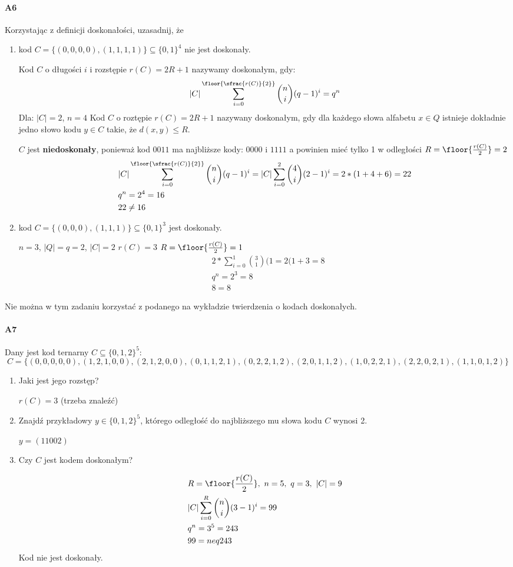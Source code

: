 \paragraph{A6} Korzystając z definicji doskonałości, uzasadnij, że
\begin{enumerate}[label=\alph*)]
\item kod $C = \{(0, 0, 0, 0),(1, 1, 1, 1)\} \subseteq \{0, 1\}^4$ nie jest doskonały.


Kod $C$ o długości $i$ i rozstępie $r(C)=2R+1$ nazywamy doskonałym, gdy:
$$|C|\sum_{i=0}^{\floor{\sfrac{r(C)}{2}}}\binom{n}{i}(q-1)^i=q^n$$
Dla: $|C|=2$, $n=4$ Kod $C$ o roztępie $r(C)=2R+1$ nazywany doskonałym, gdy dla każdego słowa alfabetu $x\in Q$ istnieje dokładnie jedno słowo kodu $y\in C$ takie, że $d(x,y)\leq R$.

$C$ jest \textbf{niedoskonały}, ponieważ kod $0011$ ma najbliższe kody: $0000$ i $1111$ a powinien mieć tylko 1 w odległości $R=\floor{\frac{r(C)}{2}}=2$
\begin{align*}
&|C|\sum_{i=0}^{\floor{\sfrac{r(C)}{2}}}\binom{n}{i}(q-1)^i = |C|\sum_{i=0}^{2}\binom{4}{i}(2-1)^i=2*(1+4+6)=22\\
&q^n=2^4=16\\
&22\neq 16
\end{align*}
\item kod $C = \{(0, 0, 0),(1, 1, 1)\} \subseteq \{0, 1\}^3$ jest doskonały. 

$n=3$, $|Q|=q=2$, $|C|=2$ $r(C)=3$ $R=\floor{\frac{r(C)}{2}}=1$
\begin{align*}
&2*\sum _{i=0}^1\binom{3}{1}(1=2(1+3=8\\
&q^n=2^3=8\\
&8=8
\end{align*}
\end{enumerate}
Nie można w tym zadaniu korzystać z podanego na wykładzie twierdzenia o kodach doskonałych.

\paragraph{A7} Dany jest kod ternarny $C \subseteq \{0, 1, 2\}^5$:
$$C = \{(0, 0, 0, 0, 0),(1, 2, 1, 0, 0),(2, 1, 2, 0, 0),(0, 1, 1, 2, 1),(0, 2, 2, 1, 2),(2, 0, 1, 1, 2),(1, 0, 2, 2, 1),(2, 2, 0, 2, 1),(1, 1, 0, 1, 2)\}$$
\begin{enumerate}[label=\alph*)]
\item Jaki jest jego rozstęp?

$r(C)=3$ (trzeba znaleźć)
\item Znajdź przykładowy $y \in \{0, 1, 2\}^5$, którego odległość do najbliższego mu słowa kodu $C$ wynosi 2.

$y=(11002)$
\item Czy $C$ jest kodem doskonałym?

\begin{align*}
&R=\floor{\frac{r(C)}{2}},\ n =5,\ q=3,\ |C|=9\\
&|C|\sum ^R_{i=0}\binom{n}{i}(3-1)^i=99\\
&q^n=3^5=243\\
&99=neq 243
\end{align*}
Kod nie jest doskonały.
\end{enumerate}

